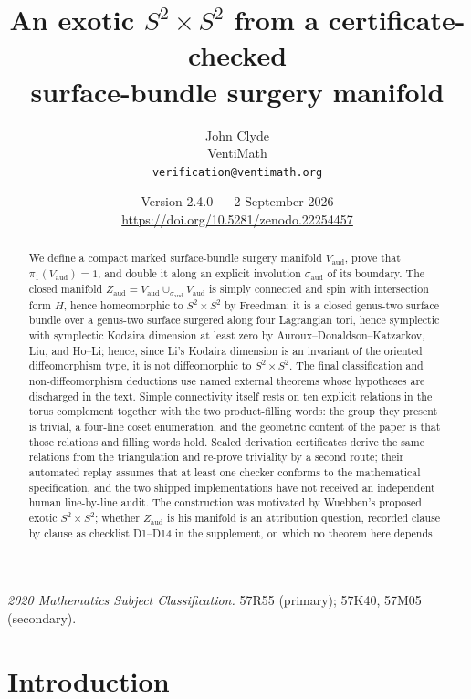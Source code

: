 \documentclass[11pt]{article}
\title{An exotic $S^2\times S^2$ from a certificate-checked\\
surface-bundle surgery manifold}
\author{John Clyde\\ \small VentiMath\\
\small \texttt{verification@ventimath.org}}
\date{Version 2.4.0 --- 2 September 2026\\
\small \url{https://doi.org/10.5281/zenodo.22254457}}
\newcommand{\pione}{\pi_1}
\theoremstyle{definition}
\begin{document}
\maketitle

\begin{abstract}
We define a compact marked surface-bundle surgery manifold
$V_{\mathrm{aud}}$, prove that $\pione(V_{\mathrm{aud}})=1$, and double it
along an explicit involution $\sigma_{\mathrm{aud}}$ of its boundary.  The
closed manifold
$Z_{\mathrm{aud}}=V_{\mathrm{aud}}\cup_{\sigma_{\mathrm{aud}}}V_{\mathrm{aud}}$
is simply connected and spin with intersection form $H$, hence homeomorphic
to $S^2\times S^2$ by Freedman; it is a closed genus-two surface bundle over
a genus-two surface surgered along four Lagrangian tori, hence symplectic
with symplectic Kodaira dimension at least zero by
Auroux--Donaldson--Katzarkov, Liu, and Ho--Li; hence, since Li's Kodaira
dimension is an invariant of the oriented diffeomorphism type, it is not
diffeomorphic to $S^2\times S^2$.  The final classification and
non-diffeomorphism deductions use named external theorems whose hypotheses
are discharged in the text.  Simple connectivity itself rests on ten
explicit relations in the torus complement together with the two
product-filling words: the group they present is trivial, a four-line coset
enumeration, and the geometric content of the paper is that those relations
and filling words hold.  Sealed derivation certificates derive the same
relations from the triangulation and re-prove triviality by a second route;
their automated replay assumes that at least one checker conforms to the
mathematical specification, and the two shipped implementations have not
received an independent human line-by-line audit.  The construction was
motivated by Wuebben's proposed exotic $S^2\times S^2$; whether
$Z_{\mathrm{aud}}$ is his manifold is an attribution question, recorded
clause by clause as checklist D1--D14 in the supplement, on which no
theorem here depends.
\end{abstract}

\noindent\textit{2020 Mathematics Subject Classification.}
57R55 (primary); 57K40, 57M05 (secondary).

\section{Introduction}
\end{document}
